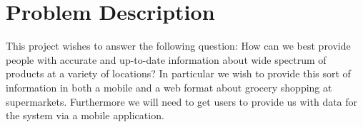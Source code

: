 \section{Problem Description}

This project wishes to answer the following question:
How can we best provide people with accurate and up-to-date information about wide spectrum of products at a variety of locations?
In particular we wish to provide this sort of information in both a mobile and a web format about grocery shopping at supermarkets. 
Furthermore we will need to get users to provide us with data for the system via a mobile application.
